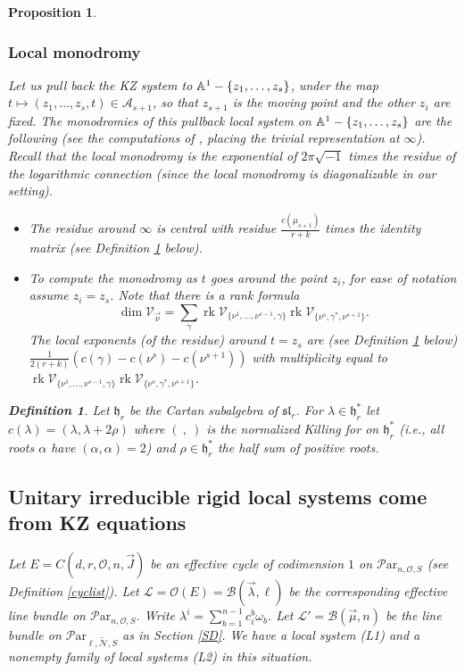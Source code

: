 \documentclass[11pt]{amsart}
\newcommand\frh{\mathfrak{h}}
\newcommand\ml{\mathcal{L}}
\newcommand\rk{\operatorname{rk}}
\newcommand\Par{\mathcal{P}\text{ar} }
\newtheorem{proposition}[theorem]{Proposition}
\newtheorem{defi}[theorem]{Definition}
\numberwithin{theorem}{subsection}
\begin{document}
{\begin{proposition}
\subsubsection{Local monodromy}\label{clarinet}
Let us pull back the KZ system to $\Bbb{A}^1-\{z_1,\dots,z_s\}$, under the map $t\mapsto (z_1,\dots,z_s,t)\in\mathcal{A}_{s+1}$, so that $z_{s+1}$ is the moving point and the other $z_i$ are fixed. The monodromies of this pullback local system
on  $\Bbb{A}^1-\{z_1,\dots,z_s\}$ are the following (see the computations of \cite[Section 3.1]{naf}, placing the trivial representation at $\infty$). Recall that the local monodromy is  the exponential of $2\pi\sqrt{-1}$ times the residue of the logarithmic connection (since the local monodromy is diagonalizable in our setting).
\begin{itemize}
\item[-] The residue around $\infty$ is central with residue  $\frac{c(\mu_{s+1})}{r+k}$ times the identity matrix (see Definition  \ref{ls} below).
\item[-] To compute the monodromy as $t$ goes around the point $z_i$, for ease of notation assume $z_i=z_s$. Note that there is a rank formula
$$ \dim \mathcal{V}_{\vec{\nu}}=\sum_{\gamma}\rk \mathcal{V}_{\{\nu^1,\dots,\nu^{s-1},\gamma\}} \rk \mathcal{V}_{\{\nu^s,\gamma^*,\nu^{s+1}\}}.$$
The local exponents (of the residue)  around $t=z_s$ are (see Definition  \ref{ls} below)  $\frac{1}{2(r+k)}(c(\gamma)-c(\nu^s)-c(\nu^{s+1}))$ with multiplicity equal to $\rk \mathcal{V}_{\{\nu^1,\dots,\nu^{s-1},\gamma\}} \rk \mathcal{V}_{\{\nu^s,\gamma^*,\nu^{s+1}\}}$.
\end{itemize}


\begin{defi}\label{ls} Let $\frh_r$  be the Cartan subalgebra of $\mathfrak{sl}_r$. For $\lambda\in\frh_r^*$ let
$c(\lambda)=(\lambda,\lambda+2\rho)$ where $(\ ,\ )$ is the normalized Killing for on $\frh_r^*$ (i.e., all roots $\alpha$ have $(\alpha,\alpha)=2$)  and $\rho\in\frh_r^*$ the half sum of positive roots.
\end{defi}
\subsection{Unitary irreducible rigid local systems come from KZ equations}\label{KZstuff}
Let $E=C(d,r,\mathcal{O},n,\vec{J})$ be an effective cycle of codimension $1$ on $\Par_{n,\mathcal{O},S}$ (see Definition  \ref{cyclist}). Let $\ml=\mathcal{O}(E)=\mathcal{B}(\vec{\lambda},\ell)$ be the corresponding effective line bundle on $\Par_{n,\mathcal{O},S}$.  Write $\lambda^i=\sum_{b=1}^{n-1} c^b_i\omega_b$. Let
$\ml'=\mathcal{B}(\vec{\mu},n)$ be the  line bundle on $\Par_{\ell,\widetilde{\mathcal{N}},S}$ as in Section \ref{SD}. We have a local system (L1) and a nonempty family of local systems (L2) in this situation.
\begin{enumerate}


\end{enumerate}
\end{proposition}}
\end{document}

